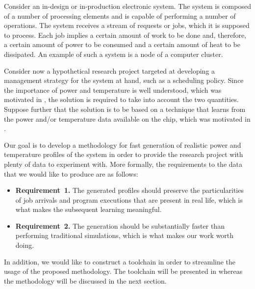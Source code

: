 Consider an in-design or in-production electronic system. The system is composed
of a number of processing elements and is capable of performing a number of
operations. The system receives a stream of requests or jobs, which it is
supposed to process. Each job implies a certain amount of work to be done and,
therefore, a certain amount of power to be consumed and a certain amount of heat
to be dissipated. An example of such a system is a node of a computer cluster.

Consider now a hypothetical research project targeted at developing a management
strategy for the system at hand, such as a scheduling policy. Since the
importance of power and temperature is well understood, which was motivated in
, the solution is required to take into account the two
quantities. Suppose further that the solution is to be based on a technique that
learns from the power and/or temperature data available on the chip, which was
motivated in .

Our goal is to develop a methodology for fast generation of realistic power and
temperature profiles of the system in order to provide the research project with
plenty of data to experiment with. More formally, the requirements to the data
that we would like to produce are as follows:

\begin{itemize}
  \item {\bfseries Requirement~1.} The generated profiles should preserve the
  particularities of job arrivals and program executions that are present in
  real life, which is what makes the subsequent learning meaningful.

  \item {\bfseries Requirement~2.} The generation should be substantially faster
  than performing traditional simulations, which is what makes our work worth
  doing.
\end{itemize}

In addition, we would like to construct a toolchain in order to streamline the
usage of the proposed methodology. The toolchain will be presented in
 whereas the methodology will be discussed in the next section.
